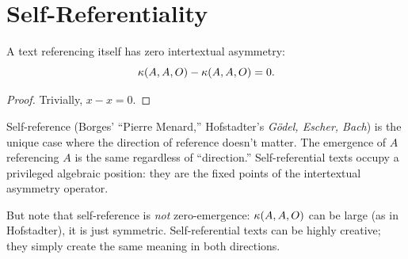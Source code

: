 \section{Self-Referentiality}

\begin{theorem}
\label{thm:self-ref}
A text referencing itself has zero intertextual asymmetry:
\[
  \kappa(A, A, O) - \kappa(A, A, O) = 0.
\]
\end{theorem}

\begin{proof}
Trivially, $x - x = 0$.
\end{proof}

\begin{interpretation}
Self-reference (Borges' ``Pierre Menard,'' Hofstadter's \textit{G\"odel,
Escher, Bach}) is the unique case where the direction of reference
doesn't matter.  The emergence of $A$ referencing $A$ is the same
regardless of ``direction.''  Self-referential texts occupy a
privileged algebraic position: they are the fixed points of the
intertextual asymmetry operator.

But note that self-reference is \emph{not} zero-emergence: $\kappa(A, A, O)$
can be large (as in Hofstadter), it is just symmetric.  Self-referential
texts can be highly creative; they simply create the same meaning in
both directions.
\end{interpretation}
